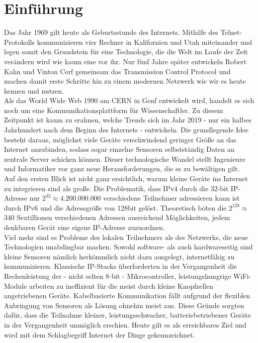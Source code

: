 \section{Einführung}

	Das Jahr 1969 gilt heute als Geburtsstunde des Internets. Mithilfe des Telnet-Protokolls kommunizieren vier Rechner in Kalifornien und Utah miteinander und legen somit den Grundstein für eine Technologie, die die Welt im Laufe der Zeit verändern wird wie kaum eine vor ihr. \cite{lmzgeschichte} Nur fünf Jahre später entwickeln Robert Kahn und Vinton Cerf gemeinsam das Transmission Control Protocol und machen damit erste Schritte hin zu einem modernen Netzwerk wie wir es heute kennen und nutzen.\\
	Als das World Wide Web 1990 am CERN in Genf entwickelt wird, handelt es sich noch um eine Kommunikationsplattform für Wissenschaftler. Zu diesem Zeitpunkt ist kaum zu erahnen, welche Trends sich im Jahr 2019 - nur ein halbes Jahrhundert nach dem Beginn des Internets - entwickeln. Die grundlegende Idee besteht daraus, möglichst viele Geräte verschwindend geringer Größe an das Internet anzubinden, sodass sogar einzelne Sensoren selbstständig Daten an zentrale Server schicken können. Dieser technologische Wandel stellt Ingenieure und Informatiker vor ganz neue Herausforderungen, die es zu bewältigen gilt. \\
	Auf den ersten Blick ist nicht ganz ersichtlich, warum kleine Geräte ins Internet zu integrieren sind als große. Die Problematik, dass IPv4 durch die 32-bit IP-Adresse nur $2^32\approx4.200.000.000$ verschiedene Teilnehmer adressieren kann ist durch IPv6 und die Adressgröße von 128bit gelöst. Theoretisch böten die $2^128\approx$ 340 Sextillionen verschiedenen Adressen ausreichend Möglichkeiten, jedem denkbaren Gerät eine eigene IP-Adresse zuzuordnen.\\
	Viel mehr sind es Probleme des lokalen Teilnehmers als des Netzwerks, die neue Technologien unabdingbar machen. Sowohl software- als auch hardwareseitig sind kleine Sensoren nämlich herkömmlich nicht dazu ausgelegt, internetfähig zu kommunizieren. Klassische IP-Stacks überforderten in der Vergangenheit die Rechenleistung der - nicht selten 8-bit - Mikrocontroller, leistungshungrige WiFi-Module arbeiten zu ineffizient für die meist durch kleine Knopfzellen angetriebenen Geräte. Kabelbasierte Kommunikation fällt aufgrund der flexiblen Anbringung von Sensoren als Lösung ohnehin meist aus. Diese Gründe sorgten dafür, dass die Teilnahme kleiner, leistungsschwacher, batteriebetriebener Geräte in der Vergangenheit unmöglich erschien. Heute gilt es als erreichbares Ziel und wird mit dem Schlagbegriff Internet der Dinge gekennzeichnet.\\
